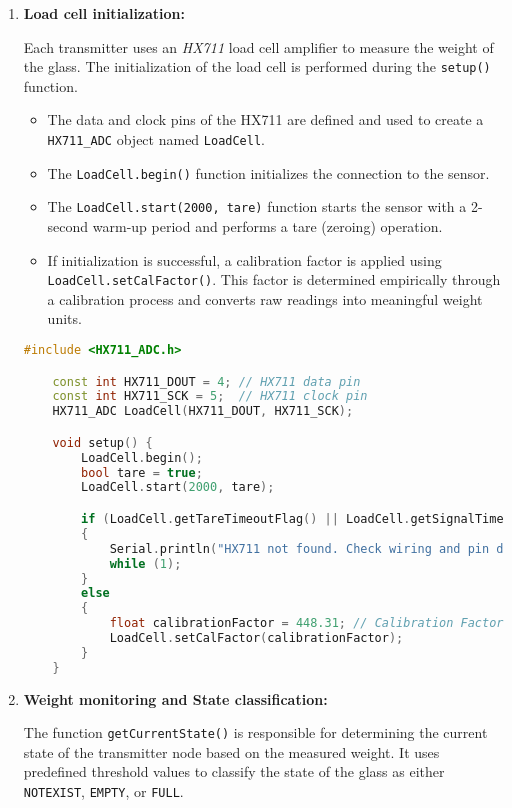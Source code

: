 \begin{enumerate}
    \item \textbf{Load cell initialization:}{
    Each transmitter uses an \textit{HX711} load cell amplifier to measure the weight of the glass. 
    The initialization of the load cell is performed during the \texttt{setup()} function.

    \begin{itemize}
        \item The data and clock pins of the HX711 are defined and used to create a \texttt{HX711\_ADC} object named \texttt{LoadCell}.
        \item The \texttt{LoadCell.begin()} function initializes the connection to the sensor.
        \item The \texttt{LoadCell.start(2000, tare)} function starts the sensor with a 2-second warm-up period and performs a tare (zeroing) operation.
        \item If initialization is successful, a calibration factor is applied using \texttt{LoadCell.setCalFactor()}. This factor is determined empirically through a calibration process and converts raw readings into meaningful weight units.
    \end{itemize}


    \begin{lstlisting}[language=C++, caption={Load cell initialization}]
    #include <HX711_ADC.h>

    const int HX711_DOUT = 4; // HX711 data pin
    const int HX711_SCK = 5;  // HX711 clock pin
    HX711_ADC LoadCell(HX711_DOUT, HX711_SCK);

    void setup() {
        LoadCell.begin();
        bool tare = true;
        LoadCell.start(2000, tare);

        if (LoadCell.getTareTimeoutFlag() || LoadCell.getSignalTimeoutFlag())
        {
            Serial.println("HX711 not found. Check wiring and pin designations.");
            while (1);
        }
        else
        {
            float calibrationFactor = 448.31; // Calibration Factor
            LoadCell.setCalFactor(calibrationFactor);
        }
    }
    \end{lstlisting}}

    \item \textbf{Weight monitoring and State classification:}{
    The function \texttt{getCurrentState()} is responsible for determining the current state of the transmitter node based on the measured weight. 
    It uses predefined threshold values to classify the state of the glass as either \texttt{NOTEXIST}, \texttt{EMPTY}, or \texttt{FULL}.

}
\end{enumerate}

